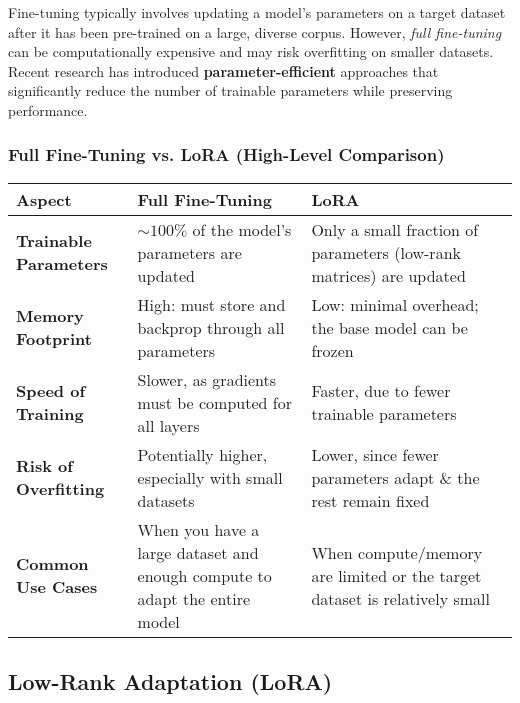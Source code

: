 \noindent
Fine-tuning typically involves updating a model's parameters on a target dataset after it has been pre-trained on a large, diverse corpus. However, \emph{full fine-tuning} can be computationally expensive and may risk overfitting on smaller datasets. Recent research has introduced \textbf{parameter-efficient} approaches that significantly reduce the number of trainable parameters while preserving performance.

\subsubsection*{Full Fine-Tuning vs. LoRA (High-Level Comparison)}
\begin{center}
\renewcommand{\arraystretch}{1.3}
\begin{tabular}{p{} | p{} p{}}
\hline
\textbf{Aspect} & \textbf{Full Fine-Tuning} & \textbf{LoRA} \\ \hline
\textbf{Trainable Parameters} 
& \(\sim\!100\%\) of the model's parameters are updated 
& Only a small fraction of parameters (low-rank matrices) are updated \\

\textbf{Memory Footprint} 
& High: must store and backprop through all parameters 
& Low: minimal overhead; the base model can be frozen \\

\textbf{Speed of Training} 
& Slower, as gradients must be computed for all layers 
& Faster, due to fewer trainable parameters \\

\textbf{Risk of Overfitting} 
& Potentially higher, especially with small datasets 
& Lower, since fewer parameters adapt \& the rest remain fixed \\

\textbf{Common Use Cases} 
& When you have a large dataset and enough compute to adapt the entire model 
& When compute/memory are limited or the target dataset is relatively small \\ \hline
\end{tabular}
\end{center}

\subsection{Low-Rank Adaptation (LoRA)}
\label{subsec:lora}


